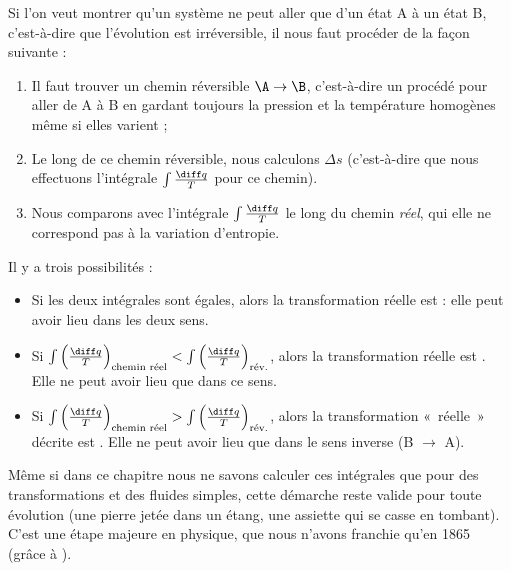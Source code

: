 		Si l’on veut montrer qu’un système ne peut aller que d’un état A à un état B, c’est-à-dire que l’évolution est irréversible, il nous faut procéder de la façon suivante :
	
		\begin{enumerate}
			\item Il faut trouver un chemin réversible $\A \to \B$, c’est-à-dire un procédé pour aller de A à B en gardant toujours la pression et la température homogènes même si elles varient ;
			\item Le long de ce chemin réversible, nous calculons $\Delta s$ (c’est-à-dire que nous effectuons l’intégrale $\int \frac{\diff q}{T} $ pour ce chemin).
			\item Nous comparons avec l’intégrale $\int \frac{\diff q}{T} $ le long du chemin \emph{réel}, qui elle ne correspond pas à la variation d’entropie.
		\end{enumerate}

		Il y a trois possibilités :
			\begin{itemize}
				\item Si les deux intégrales sont égales, alors la transformation réelle est  : elle peut avoir lieu dans les deux sens.
				\item Si $\int \left(\frac{\diff q}{T}\right)_\text{chemin réel} < \int \left(\frac{\diff q}{T}\right)_\text{rév.}$, alors la transformation réelle est . Elle ne peut avoir lieu que dans ce sens.
				\item Si $\int \left(\frac{\diff q}{T}\right)_\text{chemin réel} > \int \left(\frac{\diff q}{T}\right)_\text{rév.}$, alors la transformation «~réelle~» décrite est . Elle ne peut avoir lieu que dans le sens inverse (B $\to$ A). 
			\end{itemize}
			
		Même si dans ce chapitre nous ne savons calculer ces intégrales que pour des transformations et des fluides simples, cette démarche reste valide pour toute évolution (une pierre jetée dans un étang, une assiette qui se casse en tombant). C’est une étape majeure en physique, que nous n’avons franchie qu’en 1865 (grâce à ).


